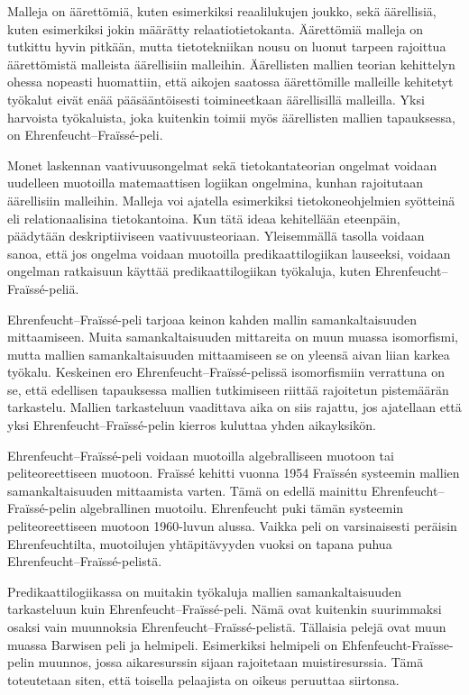 \documentclass[finnish]{tktltiki2}
\theoremstyle{definition}
\theoremstyle{remark}
\begin{document}
Malleja on äärettömiä, kuten esimerkiksi reaalilukujen joukko, sekä äärellisiä, kuten esimerkiksi jokin määrätty relaatiotietokanta. Äärettömiä malleja on tutkittu hyvin pitkään, mutta tietotekniikan nousu on luonut tarpeen rajoittua äärettömistä malleista äärellisiin malleihin. Äärellisten mallien teorian kehittelyn ohessa nopeasti huomattiin, että aikojen saatossa äärettömille malleille kehitetyt työkalut eivät enää pääsääntöisesti toimineetkaan äärellisillä malleilla. Yksi harvoista työkaluista, joka kuitenkin toimii myös äärellisten mallien tapauksessa, on Ehrenfeucht--Fraïssé-peli.

Monet laskennan vaativuusongelmat sekä tietokantateorian ongelmat voidaan uudelleen muotoilla matemaattisen logiikan ongelmina, kunhan rajoitutaan äärellisiin malleihin. Malleja voi ajatella esimerkiksi tietokoneohjelmien syötteinä eli relationaalisina tietokantoina. Kun tätä ideaa kehitellään eteenpäin, päädytään deskriptiiviseen vaativuusteoriaan. Yleisemmällä tasolla voidaan sanoa, että jos ongelma voidaan muotoilla predikaattilogiikan lauseeksi, voidaan ongelman ratkaisuun käyttää predikaattilogiikan työkaluja, kuten Ehrenfeucht--Fraïssé-peliä.

Ehrenfeucht--Fraïssé-peli tarjoaa keinon kahden mallin samankaltaisuuden mittaamiseen. Muita samankaltaisuuden mittareita on muun muassa isomorfismi, mutta mallien samankaltaisuuden mittaamiseen se on yleensä aivan liian karkea työkalu. Keskeinen ero Ehrenfeucht--Fraïssé-pelissä isomorfismiin verrattuna on se, että edellisen tapauksessa mallien tutkimiseen riittää rajoitetun pistemäärän tarkastelu. Mallien tarkasteluun vaadittava aika on siis rajattu, jos ajatellaan että yksi Ehrenfeucht--Fraïssé-pelin kierros kuluttaa yhden aikayksikön.

Ehrenfeucht--Fraïssé-peli voidaan muotoilla algebralliseen muotoon tai peliteoreettiseen muotoon. Fraïssé kehitti vuonna 1954 Fraïssén systeemin mallien samankaltaisuuden mittaamista varten. Tämä on edellä mainittu Ehrenfeucht--Fraïssé-pelin algebrallinen muotoilu. Ehrenfeucht puki tämän systeemin peliteoreettiseen muotoon 1960-luvun alussa. Vaikka peli on varsinaisesti peräisin Ehrenfeuchtilta, muotoilujen yhtäpitävyyden vuoksi on tapana puhua Ehrenfeucht--Fraïssé-pelistä.

Predikaattilogiikassa on muitakin työkaluja mallien samankaltaisuuden tarkasteluun kuin Ehrenfeucht--Fraïssé-peli. Nämä ovat kuitenkin suurimmaksi osaksi vain muunnoksia Ehrenfeucht--Fraïssé-pelistä. Tällaisia pelejä ovat muun muassa Barwisen peli ja helmipeli. Esimerkiksi helmipeli on Ehfenfeucht-Fraïsse-pelin muunnos, jossa aikaresurssin sijaan rajoitetaan muistiresurssia. Tämä toteutetaan siten, että toisella pelaajista on oikeus peruuttaa siirtonsa.
\end{document}
